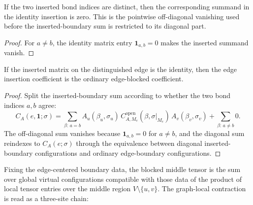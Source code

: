 \begin{theorem}%
    \label{thm:peps_edgeInsertedCoeff_identity_offDiagonal_summand}
    \leanok
    If the two inserted bond indices are distinct, then the corresponding
    summand in the identity insertion is zero. This is the pointwise
    off-diagonal vanishing used before the inserted-boundary sum is restricted
    to its diagonal part.
\end{theorem}
\begin{proof}\leanok
    For $a\ne b$, the identity matrix entry $\mathbf{1}_{a,b}=0$ makes the
    inserted summand vanish.
\end{proof}

\begin{theorem}%
    \label{thm:peps_edgeInsertedCoeff_identity}
    \leanok
    If the inserted matrix on the distinguished edge is the identity, then the
    edge insertion coefficient is the ordinary edge-blocked coefficient.
\end{theorem}
\begin{proof}\leanok
    Split the inserted-boundary sum according to whether the two bond indices
    $a,b$ agree:
    \[
        C_A(e,\mathbf{1};\sigma)
        =
        \sum_{\beta:\,a=b}
            A_u(\beta_u,\sigma_u)\,
            C^{\mathrm{open}}_{A,M_e}(\beta,\sigma|_{M_e})\,
            A_v(\beta_v,\sigma_v)
        +\sum_{\beta:\,a\ne b}0.
    \]
    The off-diagonal sum vanishes because $\mathbf{1}_{a,b}=0$ for $a\ne b$,
    and the diagonal sum reindexes to $C_A(e;\sigma)$ through the equivalence
    between diagonal inserted-boundary configurations and ordinary
    edge-boundary configurations.
\end{proof}

\begin{definition}%
    \label{def:peps_edgeMiddleWeight}
    \leanok
    Fixing the edge-centered boundary data, the blocked middle tensor is the sum
    over global virtual configurations compatible with those data of the product
    of local tensor entries over the middle region $V\setminus\{u,v\}$.
    The graph-local contraction is read as a three-site chain:
    \begin{center}
        \TNPEPSEdgeBlockingReduction
    \end{center}
\end{definition}

